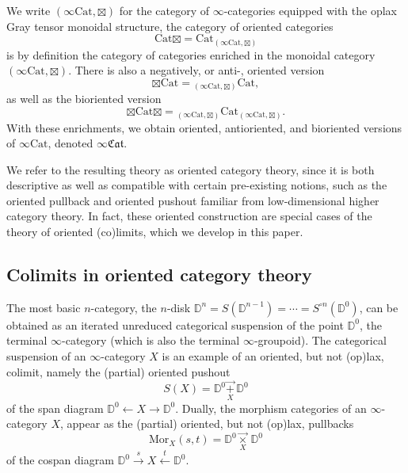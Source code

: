 \documentclass[10pt,oneside]{article}
\numberwithin{equation}{section} %
\numberwithin{figure}{section} %
\theoremstyle{plain}
\theoremstyle{definition}
\newcommand{\bD}{{\mathbb D}}
\newcommand{\Cat}{\mathrm{Cat}}
\newcommand{\Mor}{{\mathrm{Mor}}}
\newcommand{\fcat}{\mathfrak{Cat}}
\begin{document}
We write $(\infty\Cat,\boxtimes)$ for the category of $\infty$-categories equipped with the oplax Gray tensor monoidal structure, the category of oriented categories
\[
\Cat\boxtimes =\Cat_{(\infty\Cat,\boxtimes)}
\]
is by definition the category of categories enriched in the monoidal category $(\infty\Cat,\boxtimes)$.
There is also a negatively, or anti-, oriented version
\[
\boxtimes\Cat = {_{(\infty\Cat,\boxtimes)}\Cat},
\]
as well as the bioriented version
\[
\boxtimes\Cat\boxtimes = {_{(\infty\Cat,\boxtimes)}\Cat_{(\infty\Cat,\boxtimes)}}.
\]
With these enrichments, we obtain oriented, antioriented, and bioriented versions of $\infty\Cat$, denoted $\infty\fcat$.


We refer to the resulting theory as oriented category theory, since it is both descriptive as well as compatible with certain pre-existing notions, such as the oriented pullback and oriented pushout familiar from low-dimensional higher category theory.
In fact, these oriented construction are special cases of the theory of oriented (co)limits, which we develop in this paper.




\subsection{Colimits in oriented category theory}

The most basic $n$-category, the $n$-disk $\bD^n=S(\bD^{n-1})=\cdots=S^{\circ n}(\bD^0)$, can be obtained as an iterated unreduced categorical suspension of the point $\bD^0$, the terminal $\infty$-category (which is also the terminal $\infty$-groupoid).
The categorical suspension of an $\infty$-category $X$ is an example of an oriented, but not (op)lax, colimit, namely the (partial) oriented pushout
\[
S(X)=\bD^0\underset{X}{\vec{+}}\,\bD^0
\]
of the span diagram $\bD^0\xleftarrow{} X\xrightarrow{}\bD^0$.
Dually, the morphism categories of an $\infty$-category $X$, appear as the (partial) oriented, but not (op)lax, pullbacks
\[
\Mor_X(s,t)=\bD^0\underset{X}{\vec{\times}}\,\bD^0
\]
of the cospan diagram $\bD^0\xrightarrow{s} X\xleftarrow{t}\bD^0$.
\end{document}
